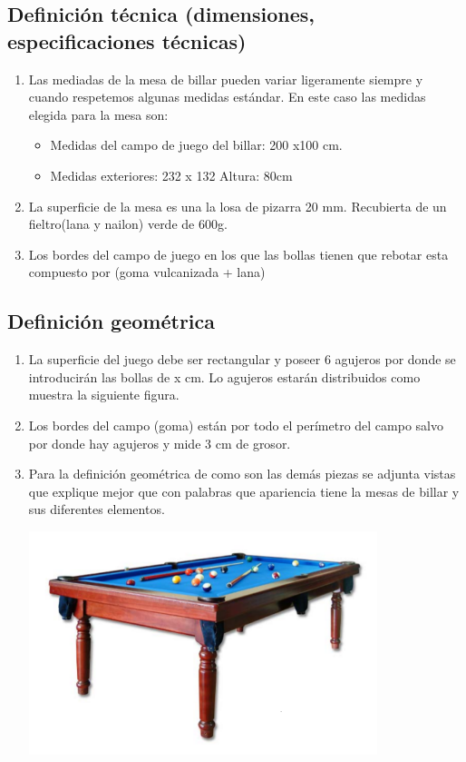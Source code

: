 	\subsection {Definición técnica (dimensiones, especificaciones técnicas)}
			\begin{enumerate}
			\item Las mediadas de la mesa de billar pueden variar ligeramente siempre y cuando respetemos algunas medidas estándar. En este caso las medidas elegida para la mesa son:
				\begin{itemize}      
				\item Medidas del campo de juego del billar: 200 x100 cm.

				\item Medidas exteriores: 232 x 132 Altura: 80cm
				\end{itemize}
				

			\item La superficie de la mesa es una la losa de pizarra 20 mm. Recubierta de un fieltro(lana y nailon) verde de 600g.

			\item Los bordes del campo de juego en los que las bollas tienen que rebotar esta compuesto por (goma vulcanizada + lana)
			\end{enumerate}


	\subsection {Definición geométrica}
		    \begin{enumerate}
		     \item La superficie del juego debe ser rectangular y poseer 6 agujeros por donde se introducirán las bollas de x cm. Lo  agujeros estarán distribuidos como
			    muestra la siguiente figura.
		     \item Los bordes del campo (goma) están por todo el perímetro del campo salvo por donde hay agujeros y mide  3 cm de grosor.

		     \item Para la definición geométrica de como son las demás piezas  se adjunta vistas que explique mejor que con palabras que apariencia tiene la mesas de billar
			  y sus diferentes elementos.
		\begin{center}
    			\includegraphics[width=0.8\textwidth]{donbillar.png}
		\end{center}	
		    \end{enumerate}


